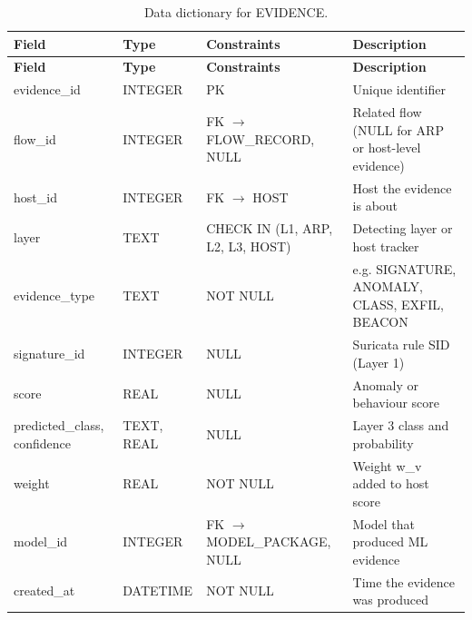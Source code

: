 {\small
\begin{longtable}{|>{\raggedright\arraybackslash}p{}|>{\raggedright\arraybackslash}p{}|>{\raggedright\arraybackslash}p{}|>{\raggedright\arraybackslash}p{}|}
\caption{Data dictionary for EVIDENCE.}\label{tab:4.20}\\
\hline
\textbf{Field} & \textbf{Type} & \textbf{Constraints} & \textbf{Description} \\ \hline
\endfirsthead
\hline
\textbf{Field} & \textbf{Type} & \textbf{Constraints} & \textbf{Description} \\ \hline
\endhead
evidence\_id & INTEGER & PK & Unique identifier \\ \hline
flow\_id & INTEGER & FK $\rightarrow$ FLOW\_RECORD, NULL & Related flow (NULL for ARP or host-level evidence) \\ \hline
host\_id & INTEGER & FK $\rightarrow$ HOST & Host the evidence is about \\ \hline
layer & TEXT & CHECK IN (L1, ARP, L2, L3, HOST) & Detecting layer or host tracker \\ \hline
evidence\_type & TEXT & NOT NULL & e.g. SIGNATURE, ANOMALY, CLASS, EXFIL, BEACON \\ \hline
signature\_id & INTEGER & NULL & Suricata rule SID (Layer 1) \\ \hline
score & REAL & NULL & Anomaly or behaviour score \\ \hline
predicted\_class, confidence & TEXT, REAL & NULL & Layer 3 class and probability \\ \hline
weight & REAL & NOT NULL & Weight w\_v added to host score \\ \hline
model\_id & INTEGER & FK $\rightarrow$ MODEL\_PACKAGE, NULL & Model that produced ML evidence \\ \hline
created\_at & DATETIME & NOT NULL & Time the evidence was produced \\ \hline
\end{longtable}
}

